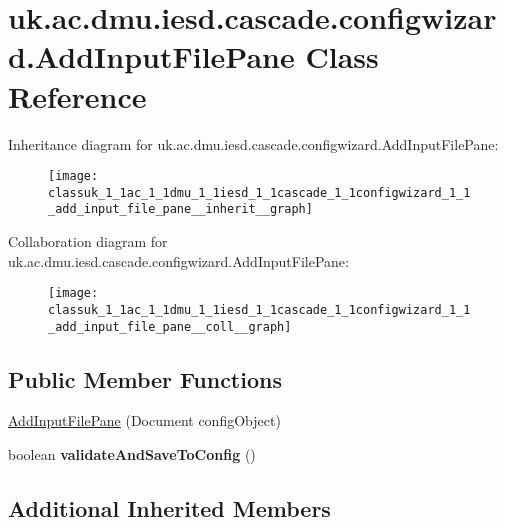 \hypertarget{classuk_1_1ac_1_1dmu_1_1iesd_1_1cascade_1_1configwizard_1_1_add_input_file_pane}{\section{uk.\-ac.\-dmu.\-iesd.\-cascade.\-configwizard.\-Add\-Input\-File\-Pane Class Reference}
\label{classuk_1_1ac_1_1dmu_1_1iesd_1_1cascade_1_1configwizard_1_1_add_input_file_pane}
}


Inheritance diagram for uk.\-ac.\-dmu.\-iesd.\-cascade.\-configwizard.\-Add\-Input\-File\-Pane\-:\nopagebreak
\begin{figure}[H]
\begin{center}
\leavevmode
\texttt{[image: classuk\_1\_1ac\_1\_1dmu\_1\_1iesd\_1\_1cascade\_1\_1configwizard\_1\_1\_add\_input\_file\_pane\_\_inherit\_\_graph]}
\end{center}
\end{figure}


Collaboration diagram for uk.\-ac.\-dmu.\-iesd.\-cascade.\-configwizard.\-Add\-Input\-File\-Pane\-:\nopagebreak
\begin{figure}[H]
\begin{center}
\leavevmode
\texttt{[image: classuk\_1\_1ac\_1\_1dmu\_1\_1iesd\_1\_1cascade\_1\_1configwizard\_1\_1\_add\_input\_file\_pane\_\_coll\_\_graph]}
\end{center}
\end{figure}
\subsection*{Public Member Functions}
\begin{DoxyCompactItemize}
\item 
\hyperlink{classuk_1_1ac_1_1dmu_1_1iesd_1_1cascade_1_1configwizard_1_1_add_input_file_pane_aab9f2770520b719879d7d6d34bd86543}{Add\-Input\-File\-Pane} (Document config\-Object)
\item 
\hypertarget{classuk_1_1ac_1_1dmu_1_1iesd_1_1cascade_1_1configwizard_1_1_add_input_file_pane_a6367e0508016652449c6a2a9d73d9b25}{boolean {\bfseries validate\-And\-Save\-To\-Config} ()}\label{classuk_1_1ac_1_1dmu_1_1iesd_1_1cascade_1_1configwizard_1_1_add_input_file_pane_a6367e0508016652449c6a2a9d73d9b25}

\end{DoxyCompactItemize}
\subsection*{Additional Inherited Members}


